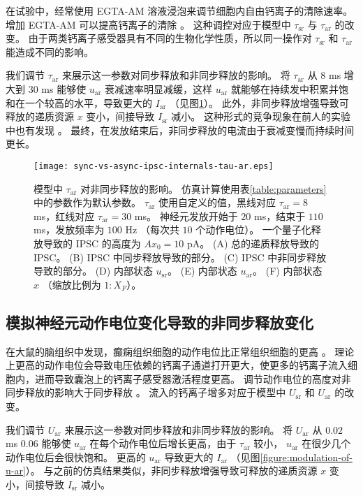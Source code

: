 在试验中，经常使用 EGTA-AM 溶液浸泡来调节细胞内自由钙离子的清除速率。
增加 EGTA-AM 可以提高钙离子的清除 \cite{Otsu2004,Jiang2015}。
这种调控对应于模型中 $\tau_\text{sr}$ 与 $\tau_\text{ar}$ 的改变。
由于两类钙离子感受器具有不同的生物化学性质，所以同一操作对 $\tau_\text{sr}$ 和 $\tau_\text{ar}$ 能造成不同的影响。

我们调节 $\tau_\text{ar}$ 来展示这一参数对同步释放和非同步释放的影响。
将 $\tau_\text{ar}$ 从 $8$ ms 增大到 $30$ ms 能够使 $u_\text{ar}$ 衰减速率明显减缓，这样 $u_\text{ar}$ 就能够在持续发中积累并饱和在一个较高的水平，导致更大的 $I_\text{ar}$ （见图\ref{figure:modulation-of-tau-ar}）。
此外，非同步释放增强导致可释放的递质资源 $x$ 变小，间接导致 $I_\text{sr}$ 减小。
这种形式的竞争现象在前人的实验中也有发现 \cite{Otsu2004}。
最终，在发放结束后，非同步释放的电流由于衰减变慢而持续时间更长。

 
\begin{figure}
\texttt{[image: sync-vs-async-ipsc-internals-tau-ar.eps]}
\caption{模型中 $\tau_\text{ar}$ 对非同步释放的影响。
仿真计算使用表\ref{table:parameters}中的参数作为默认参数。
$\tau_\text{ar}$ 使用自定义的值，黑线对应 $\tau_\text{ar} = 8$ ms，红线对应 $\tau_\text{ar} = 30$ ms。
神经元发放开始于 $20$ ms，结束于 $110$ ms，发放频率为 $100$ Hz （每次共 $10$ 个动作电位）。
一个量子化释放导致的 IPSC 的高度为 $Ax_0 = 10$ pA。
(A) 总的递质释放导致的 IPSC。
(B) IPSC 中同步释放导致的部分。
(C) IPSC 中非同步释放导致的部分。
(D) 内部状态 $u_\text{sr}$。
(E) 内部状态 $u_\text{ar}$。
(F) 内部状态 $x$ （缩放比例为 $1:X_F$）。}
\label{figure:modulation-of-tau-ar}
\end{figure}


\subsection{模拟神经元动作电位变化导致的非同步释放变化}
\label{section:result:modulate-with-u-ar}
在大鼠的脑组织中发现，癫痫组织细胞的动作电位比正常组织细胞的更高 \cite{Jiang2012}。
理论上更高的动作电位会导致电压依赖的钙离子通道打开更大，使更多的钙离子流入细胞内，进而导致囊泡上的钙离子感受器激活程度更高。
调节动作电位的高度对非同步释放的影响大于同步释放 \cite{Jiang2012}。
流入的钙离子增多对应于模型中 $U_\text{sr}$ 和 $U_\text{ar}$ 的改变。

我们调节 $U_\text{ar}$ 来展示这一参数对同步释放和非同步释放的影响。
将 $U_\text{ar}$ 从 $0.02$ ms $0.06$ 能够使 $u_\text{ar}$ 在每个动作电位后增长更高，由于 $\tau_\text{ar}$ 较小， $u_\text{ar}$ 在很少几个动作电位后会很快饱和。
更高的 $u_\text{ar}$ 导致更大的 $I_\text{ar}$ （见图\ref{figure:modulation-of-u-ar}）。
与之前的仿真结果类似，非同步释放增强导致可释放的递质资源 $x$ 变小，间接导致 $I_\text{sr}$ 减小。
 
